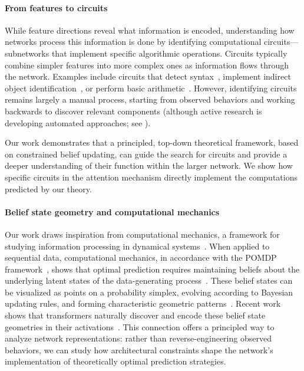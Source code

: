 \documentclass{article}
\theoremstyle{plain}
\theoremstyle{definition}
\theoremstyle{remark}
\begin{document}
\paragraph{From features to circuits}

While feature directions reveal what information is encoded, understanding how networks process this information is done by identifying computational circuits—subnetworks that implement specific algorithmic operations.
Circuits typically combine simpler features into more complex ones as information flows through the network.
Examples include circuits that detect syntax~\citep{elhage2021mathematical}, implement indirect object identification~\citep{wang2022interpretability}, or perform basic arithmetic~\citep{nanda2023mechanistic}.
However, identifying circuits remains largely a manual process, starting from observed behaviors and working backwards to discover relevant components
(although active research is developing automated approaches; see \citet{conmy2023automatedcircuitdiscoverymechanistic, marks2024sparsefeaturecircuitsdiscovering}).

Our work demonstrates that a principled, top-down theoretical framework, based on constrained belief updating, can guide the search for circuits and provide a deeper understanding of their function within the larger network. We show how specific circuits in the attention mechanism directly implement the computations predicted by our theory.

\paragraph{Belief state geometry and computational mechanics}

Our work draws inspiration from computational mechanics, a framework for studying information processing in dynamical systems~\cite{shalizi2001computational, Crutchfield12_Between, Riec18_SSAC1}. When applied to sequential data, computational mechanics, in accordance with the POMDP framework~\cite{Kaelbling98_Planning}, 
shows that optimal prediction requires maintaining beliefs about the underlying latent states of the data-generating process~\cite{Upper97_Theory}. 
These belief states can be visualized as points on a probability simplex, evolving according to Bayesian updating rules, and forming characteristic geometric patterns~\cite{Crutchfield94_Calculi, Marzen_2017}.
Recent work shows that transformers naturally discover and encode these belief state geometries in their activations~\citep{shai2024transformersrepresentbeliefstate}.
This connection offers a principled way to analyze network representations: rather than reverse-engineering observed behaviors, we can study how architectural constraints shape the network's implementation of theoretically optimal prediction strategies.
\end{document}
